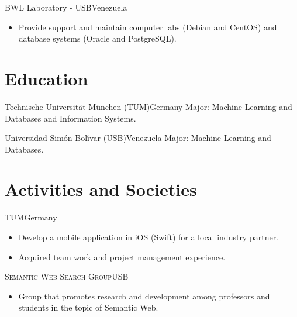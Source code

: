 \documentclass[10pt]{moderncv}
\begin{document}
 { BWL Laboratory - USB}{Venezuela}{}{%
\begin{itemize}
  \item Provide support and maintain computer labs (Debian and CentOS) and database systems (Oracle and PostgreSQL).
\end{itemize}
}

\section{Education}

  {Technische Universit\"at M\"unchen (TUM)}{Germany}{}{%
    Major: Machine Learning and Databases and Information Systems.
  }

  {Universidad Sim\'on Bol\'{\i}var (USB)}{Venezuela}{}{%
    Major: Machine Learning and Databases.
  }

\newcommand{\comment}[1]{}
\comment{
\section{Technical skills}

\cvitem{Programming Languages}{%
Proficient: Python, \textsc{JAVA}.
\newline
Familiar: shell scripting, Rust, Scala, C++, \LaTeX.
}

\cvitem{Data Storage}{%
  PostgreSQL, Redis, Elasticsearch. 
}

\cvitem{Software}{%
  \textsc{vi}, Git, Docker, Nomad, Kubernetes, ELK
}
}

\section{Activities and Societies}

{\textsc{TUM}}{Germany}{}{%
\begin{itemize}
    \item Develop a mobile application in iOS (Swift) for a local industry partner.
    \item Acquired team work and project management experience.
\end{itemize}
}

{\textsc{Semantic Web Search Group}}{USB}{}{%
\begin{itemize}
    \item Group that promotes research and development among professors and students in the topic of Semantic Web.
\end{itemize}
}
\end{document}
